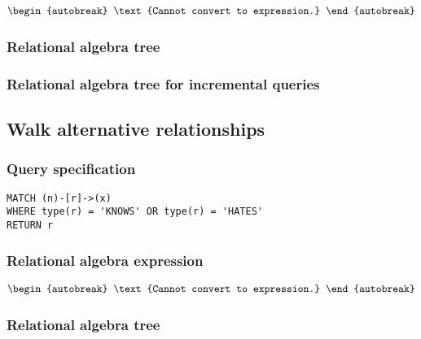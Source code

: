 \begin{align*}
\begin{autobreak}
\text{Cannot convert to expression.}
\end{autobreak}
\end{align*}

\subsubsection*{Relational algebra tree}


\subsubsection*{Relational algebra tree for incremental queries}


\subsection{Walk alternative relationships}

\subsubsection*{Query specification}

\begin{lstlisting}
MATCH (n)-[r]->(x)
WHERE type(r) = 'KNOWS' OR type(r) = 'HATES'
RETURN r
\end{lstlisting}

\subsubsection*{Relational algebra expression}

\begin{align*}
\begin{autobreak}
\text{Cannot convert to expression.}
\end{autobreak}
\end{align*}

\subsubsection*{Relational algebra tree}


